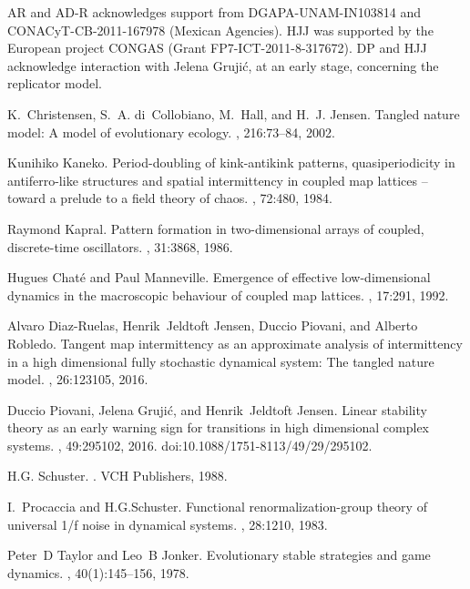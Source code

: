 \documentclass[12pt]{article}
\begin{document}
\bigskip AR and AD-R acknowledges support from DGAPA-UNAM-IN103814 and CONACyT-CB-2011-167978 (Mexican Agencies). HJJ was supported by the European project CONGAS (Grant FP7-ICT-2011-8-317672). DP and HJJ acknowledge interaction with Jelena Gruji{\'c}, at an early stage, concerning the replicator model.

\begin{thebibliography}{99}
 K.~Christensen, S.~A. di~Collobiano, M.~Hall, and H.~J. Jensen.
\newblock Tangled nature model: A model of evolutionary ecology.
, 216:73--84, 2002.

 Kunihiko Kaneko.
\newblock Period-doubling of kink-antikink patterns, quasiperiodicity in antiferro-like structures and spatial intermittency in coupled map lattices -- toward a prelude to a field theory of chaos.
, 72:480, 1984.

Raymond Kapral.
\newblock Pattern formation in two-dimensional arrays of coupled, discrete-time
  oscillators.
, 31:3868, 1986.

Hugues Chat{\'e} and Paul Manneville.
\newblock Emergence of effective low-dimensional dynamics in the macroscopic
  behaviour of coupled map lattices.
, 17:291, 1992.

Alvaro Diaz-Ruelas, Henrik~Jeldtoft Jensen, Duccio Piovani, and Alberto
  Robledo.
\newblock Tangent map intermittency as an approximate analysis of intermittency
  in a high dimensional fully stochastic dynamical system: The tangled nature
  model.
, 26:123105, 2016.

Duccio Piovani, Jelena Gruji\'c, and Henrik~Jeldtoft Jensen.
\newblock Linear stability theory as an early warning sign for transitions in
  high dimensional complex systems.
, 49:295102, 2016.
\newblock doi:10.1088/1751-8113/49/29/295102.

H.G. Schuster.
.
\newblock VCH Publishers, 1988.

I.~Procaccia and H.G.Schuster.
\newblock Functional renormalization-group theory of universal 1/f noise in
  dynamical systems.
, 28:1210, 1983.

Peter~D Taylor and Leo~B Jonker.
\newblock Evolutionary stable strategies and game dynamics.
, 40(1):145--156, 1978.



\end{thebibliography}
\end{document}
